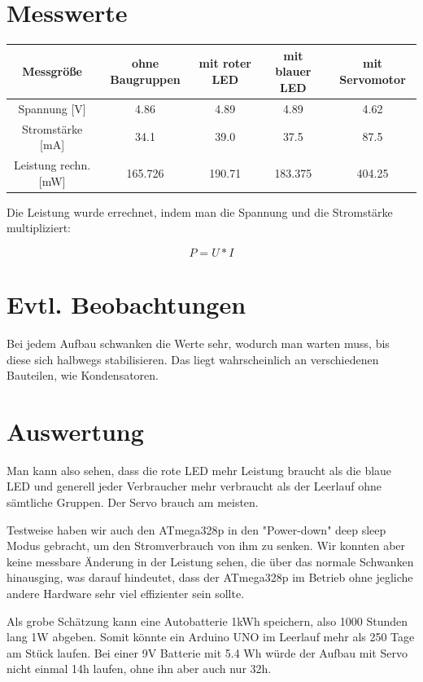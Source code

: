\documentclass[8pt, letterpaper]{article}
\begin{document}
\section{Messwerte}
\begin{center}
\begin{tabular}{ |c|c|c|c|c| }
  Messgröße & ohne Baugruppen & mit roter LED & mit blauer LED & mit Servomotor \\
  \hline
  Spannung [V] & 4.86 & 4.89 & 4.89 & 4.62 \\
  \hline
  Stromstärke [mA] & 34.1 & 39.0 & 37.5 & 87.5 \\
  \hline
  Leistung rechn. [mW] & 165.726 & 190.71 & 183.375 & 404.25 \\
  \hline
\end{tabular}
\end{center}

Die Leistung wurde errechnet, indem man die Spannung und die Stromstärke multipliziert:

\[ P = U * I \]

\section{Evtl. Beobachtungen}
Bei jedem Aufbau schwanken die Werte sehr, wodurch man warten muss, bis diese sich halbwegs stabilisieren. Das liegt wahrscheinlich an verschiedenen Bauteilen, wie Kondensatoren.

\section{Auswertung}
Man kann also sehen, dass die rote LED mehr Leistung braucht als die blaue LED und generell jeder Verbraucher mehr verbraucht als der Leerlauf ohne sämtliche Gruppen. Der Servo brauch am meisten.

Testweise haben wir auch den ATmega328p in den "Power-down" deep sleep Modus gebracht, um den Stromverbrauch von ihm zu senken. Wir konnten aber keine messbare Änderung in der Leistung sehen, die über das normale Schwanken hinausging, was darauf hindeutet, dass der ATmega328p im Betrieb ohne jegliche andere Hardware sehr viel effizienter sein sollte.

Als grobe Schätzung kann eine Autobatterie 1kWh speichern, also 1000 Stunden lang 1W abgeben. Somit könnte ein Arduino UNO im Leerlauf mehr als 250 Tage am Stück laufen.
Bei einer 9V Batterie mit 5.4 Wh würde der Aufbau mit Servo nicht einmal 14h laufen, ohne ihn aber auch nur 32h.
\end{document}
